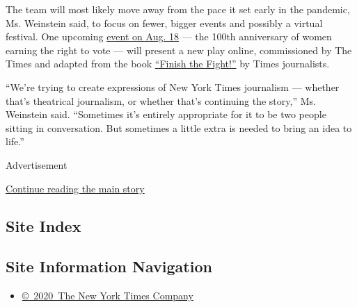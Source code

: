 The team will most likely move away from the pace it set early in the
pandemic, Ms. Weinstein said, to focus on fewer, bigger events and
possibly a virtual festival. One upcoming
\href{https://timesevents.nytimes3xbfgragh.onion/thejoyofgymlessworkouts}{event
on Aug. 18} --- the 100th anniversary of women earning the right to vote
--- will present a new play online, commissioned by The Times and
adapted from the book
\href{https://www.nytimes3xbfgragh.onion/2020/07/24/books/finish-the-fight-excerpt.html}{``Finish
the Fight!''} by Times journalists.

``We're trying to create expressions of New York Times journalism ---
whether that's theatrical journalism, or whether that's continuing the
story,'' Ms. Weinstein said. ``Sometimes it's entirely appropriate for
it to be two people sitting in conversation. But sometimes a little
extra is needed to bring an idea to life.''

Advertisement

\protect\hyperlink{after-bottom}{Continue reading the main story}

\hypertarget{site-index}{%
\subsection{Site Index}\label{site-index}}

\hypertarget{site-information-navigation}{%
\subsection{Site Information
Navigation}\label{site-information-navigation}}

\begin{itemize}
\tightlist
\item
  \href{https://help.nytimes3xbfgragh.onion/hc/en-us/articles/115014792127-Copyright-notice}{©~2020~The
  New York Times Company}
\end{itemize}

